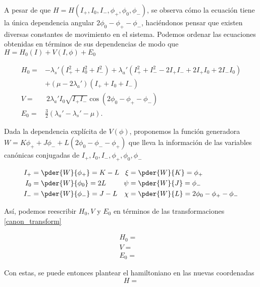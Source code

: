 A pesar de que $H = H(I_+,I_0,I_-,\phi_+,\phi_0,\phi_-)$, se observa cómo la ecuación tiene la única dependencia angular $2\phi_0 - \phi_+ - \phi_-$, haciéndonos pensar que existen diversas constantes de movimiento en el sistema. Podemos ordenar las ecuaciones obtenidas en términos de sus dependencias de modo que $H = H_0(I) + V(I,\phi) + E_0$

\begin{align}
H_0 =& - \lambda_s'\left( I_+^2 + I_0^2 + I_-^2 \right) + \lambda_a' \left( I_+^2 + I_-^2 - 2I_+I_- + 2I_+I_0 + 2I_-I_0 \right) \nonumber \\
&+  (\mu - 2\lambda_a')\left(I_+ + I_0 + I_-\right) \\
V =& \ 2 \lambda_a' I_0 \sqrt{I_+I_-} \cos{(2\phi_0 - \phi_+ - \phi_-)} \\
E_0 =& \frac{3}{2}\left( \lambda_a' - \lambda_s' - \mu \right).
\end{align}

Dada la dependencia explícita de $V(\phi)$, proponemos la función generadora $W=K\phi_+ + J\phi_- + L(2\phi_0 - \phi_- - \phi_+)$ que lleva la información de las variables canónicas conjugadas de  $I_+,I_0,I_-,\phi_+,\phi_0,\phi_-$

\begin{equation}
\begin{aligned}[c]
I_+ &= \pder{W}{\phi_+} = K-L \\
I_0 &= \pder{W}{\phi_0} = 2L \\
I_- &= \pder{W}{\phi_-} = J-L 
\end{aligned}
\ \ 
\begin{aligned}[c]
\xi &= \pder{W}{K} = \phi_+ \\ 
\psi &= \pder{W}{J} = \phi_- \\
\chi  &= \pder{W}{L} = 2\phi_0 - \phi_+ - \phi_- 
\end{aligned}
\label{canon_transform}
\end{equation}

Así, podemos reescribir $H_0, V$ y $E_0$ en términos de las transformaciones \ref{canon_transform}

\begin{align}
H_0 =& \\
V =& \\ 
E_0 =& 
\end{align}

Con estas, se puede entonces plantear el hamiltoniano en las nuevas coordenadas
\begin{equation}
H = 
\end{equation}

